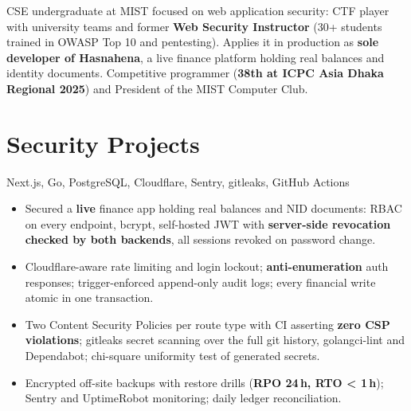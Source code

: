 \documentclass[10pt,a4paper]{article}
\begin{document}

CSE undergraduate at MIST focused on web application security: CTF player with university teams and former
\textbf{Web Security Instructor} (30+ students trained in OWASP Top 10 and pentesting). Applies it in production as
\textbf{sole developer of Hasnahena}, a live finance platform holding real balances and identity documents.
Competitive programmer (\textbf{38th at ICPC Asia Dhaka Regional 2025}) and President of the MIST Computer Club.

\vspace{6pt}




\section{Security Projects}
{ \textbar{} }
{Next.js, Go, PostgreSQL, Cloudflare, Sentry, gitleaks, GitHub Actions}
{\begin{itemize}
  \item Secured a \textbf{live} finance app holding real balances and NID documents: RBAC on every endpoint, bcrypt, self-hosted JWT with \textbf{server-side revocation checked by both backends}, all sessions revoked on password change.
  \item Cloudflare-aware rate limiting and login lockout; \textbf{anti-enumeration} auth responses; trigger-enforced append-only audit logs; every financial write atomic in one transaction.
  \item Two Content Security Policies per route type with CI asserting \textbf{zero CSP violations}; gitleaks secret scanning over the full git history, golangci-lint and Dependabot; chi-square uniformity test of generated secrets.
  \item Encrypted off-site backups with restore drills (\textbf{RPO 24\,h, RTO \textless{} 1\,h}); Sentry and UptimeRobot monitoring; daily ledger reconciliation.
\end{itemize}}

\end{document}
